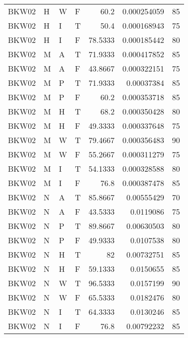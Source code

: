 \begin{table}[!htb]
{\begin{tabular}{llllrrr}
            BKW02    & H     & W     & F          & 60.2       & 0.000254059 & 85       \\
            BKW02    & H     & I     & T          & 50.4       & 0.000168943 & 75       \\
            BKW02    & H     & I     & F          & 78.5333    & 0.000185442 & 80       \\
            BKW02    & M     & A     & T          & 71.9333    & 0.000417852 & 85       \\
            BKW02    & M     & A     & F          & 43.8667    & 0.000322151 & 75       \\
            BKW02    & M     & P     & T          & 71.9333    & 0.00037384  & 85       \\
            BKW02    & M     & P     & F          & 60.2       & 0.000353718 & 85       \\
            BKW02    & M     & H     & T          & 68.2       & 0.000350428 & 80       \\
            BKW02    & M     & H     & F          & 49.3333    & 0.000337648 & 75       \\
            BKW02    & M     & W     & T          & 79.4667    & 0.000356483 & 90       \\
            BKW02    & M     & W     & F          & 55.2667    & 0.000311279 & 75       \\
            BKW02    & M     & I     & T          & 54.1333    & 0.000328588 & 80       \\
            BKW02    & M     & I     & F          & 76.8       & 0.000387478 & 85       \\
            BKW02    & N     & A     & T          & 85.8667    & 0.00555429  & 70       \\
            BKW02    & N     & A     & F          & 43.5333    & 0.0119086   & 75       \\
            BKW02    & N     & P     & T          & 89.8667    & 0.00630503  & 80       \\
            BKW02    & N     & P     & F          & 49.9333    & 0.0107538   & 80       \\
            BKW02    & N     & H     & T          & 82         & 0.00732751  & 85       \\
            BKW02    & N     & H     & F          & 59.1333    & 0.0150655   & 85       \\
            BKW02    & N     & W     & T          & 96.5333    & 0.0157199   & 90       \\
            BKW02    & N     & W     & F          & 65.5333    & 0.0182476   & 80       \\
            BKW02    & N     & I     & T          & 64.3333    & 0.0130246   & 85       \\
            BKW02    & N     & I     & F          & 76.8       & 0.00792232  & 85       \\
            \hline
        \end{tabular}
    }{}
\end{table}